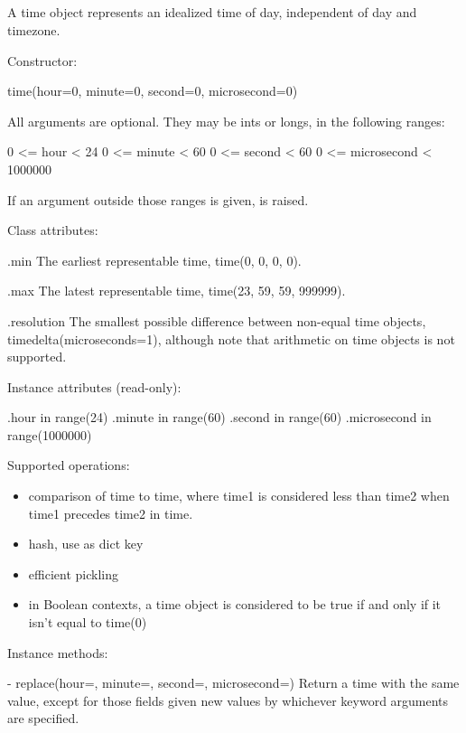 \subsection{ \label{datetime-time}}

A time object represents an idealized time of day, independent of day
and timezone.

Constructor:

    time(hour=0, minute=0, second=0, microsecond=0)

    All arguments are optional.  They may be ints or longs, in the
    following ranges:

        0 <= hour < 24
        0 <= minute < 60
        0 <= second < 60
        0 <= microsecond < 1000000

    If an argument outside those ranges is given,
     is raised.

Class attributes:

    .min
        The earliest representable time, time(0, 0, 0, 0).

    .max
        The latest representable time, time(23, 59, 59, 999999).

    .resolution
        The smallest possible difference between non-equal time
        objects, timedelta(microseconds=1), although note that
        arithmetic on time objects is not supported.

Instance attributes (read-only):

    .hour           in range(24)
    .minute         in range(60)
    .second         in range(60)
    .microsecond    in range(1000000)

Supported operations:

\begin{itemize}
  \item
    comparison of time to time, where time1 is considered
    less than time2 when time1 precedes time2 in time.

  \item
    hash, use as dict key

  \item
    efficient pickling

  \item
    in Boolean contexts, a time object is considered to be true
    if and only if it isn't equal to time(0)
\end{itemize}

Instance methods:

  - replace(hour=, minute=, second=, microsecond=)
    Return a time with the same value, except for those fields given
    new values by whichever keyword arguments are specified.

